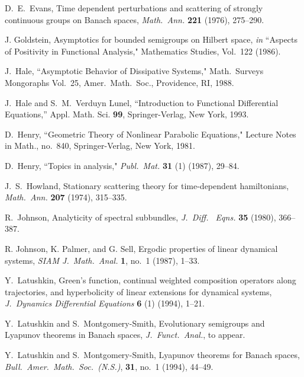 \begin{thebibliography}{99}
D.~E.~Evans,  Time dependent perturbations and scattering
of strongly continuous groups on Banach spaces,
{\em Math.~Ann.}
{\bf 221} (1976), 275--290.


 J. Goldstein,
Asymptotics for bounded semigroups
on Hilbert space, {\em in} ``Aspects of Positivity in Functional
Analysis," Mathematics Studies, Vol.~122  (1986).

 J.~Hale,
``Asymptotic Behavior of Dissipative Systems,"
Math.~Surveys Mongoraphs Vol.~25,
Amer.~Math.~Soc., Providence, RI, 1988.

 J.~Hale and S.~M.~Verduyn Lunel,
``Introduction to Functional Differential Equations,''
Appl. Math. Sci. {\bf 99}, Springer-Verlag, New York, 1993.

 D.~Henry,
``Geometric Theory of Nonlinear Parabolic Equations,"
Lecture Notes in Math., no.~840,  Springer-Verlag, New York, 1981.

 D.~Henry,
``Topics in analysis,"
{\em Publ.~Mat.}
{\bf 31} (1) (1987), 29--84.

 J.~S.~Howland,
Stationary scattering theory for time-dependent hamiltonians,
{\em Math.~Ann.}
{\bf 207} (1974), 315--335.

 R.~Johnson,
Analyticity of spectral subbundles,
{\em J.~Diff.~ Eqns.}
{\bf 35} (1980), 366--387.

  R. Johnson, K. Palmer, and G. Sell,
Ergodic properties of linear dynamical systems,
{\em SIAM J.~Math.~Anal.}
{\bf 1}, no.~1 (1987), 1--33.

 Y.~Latushkin,
Green's function, continual weighted composition operators along
trajectories, and hyperbolicity of linear extensions for dynamical
systems,
{\em J.~Dynamics  Differential Equations}
{\bf 6} (1) (1994), 1--21.

 Y.~Latushkin and S.~Montgomery-Smith,
Evolutionary semigroups and Lyapunov theorems in Banach spaces,
{\em J.~Funct.~Anal.},
to appear.

 Y.~Latushkin and S.~Montgomery-Smith,
Lyapunov theorems for Banach spaces,
{\em Bull.~Amer.~Math.~Soc.~(N.S.)},
{\bf 31}, no.~1 (1994), 44--49.


\end{thebibliography}
